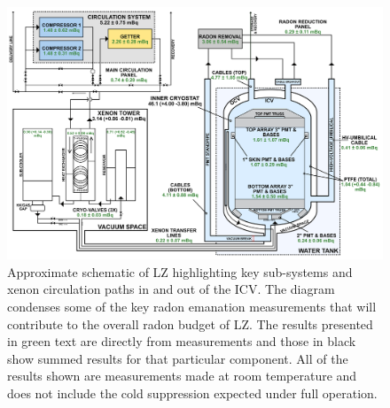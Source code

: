 %
\vspace{1.5cm}
\begin{figure}[h]
    \centering
    \hspace*{-0.2cm}
    \includegraphics[scale=0.3]{Chapter_4/Figures/LZ_Radon_Diagram_Paper.png}
    \caption
    {Approximate schematic of LZ highlighting key sub-systems and xenon circulation paths in and out of the ICV. The diagram condenses some of the key radon emanation measurements that will contribute to the overall radon budget of LZ. The results presented in green text are directly from measurements and those in black show summed results for that particular component. All of the results shown are measurements made at room temperature and does not include the cold suppression expected under full operation.}
    \label{LZ_radon_diagram_paper}
\end{figure}
%

%

%